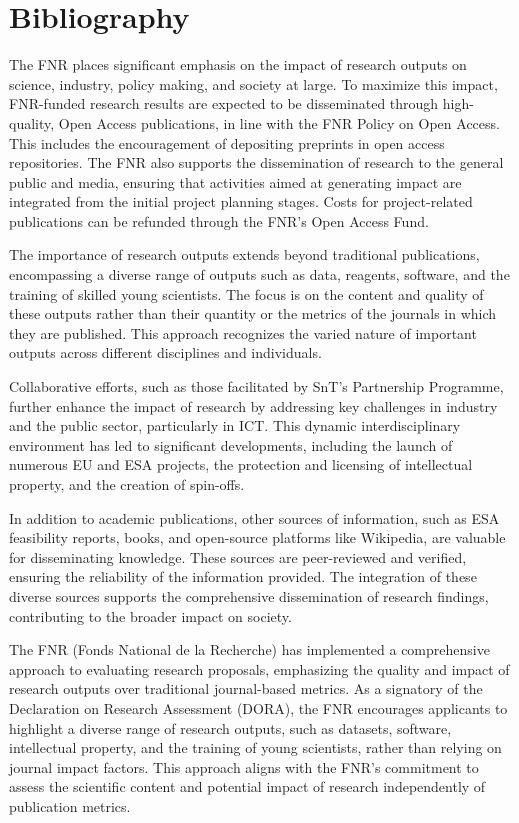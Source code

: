 \documentclass{article}
\begin{document}
\section{Bibliography}

The FNR places significant emphasis on the impact of research outputs on science, industry, policy making, and society at large. To maximize this impact, FNR-funded research results are expected to be disseminated through high-quality, Open Access publications, in line with the FNR Policy on Open Access. This includes the encouragement of depositing preprints in open access repositories. The FNR also supports the dissemination of research to the general public and media, ensuring that activities aimed at generating impact are integrated from the initial project planning stages. Costs for project-related publications can be refunded through the FNR’s Open Access Fund.

The importance of research outputs extends beyond traditional publications, encompassing a diverse range of outputs such as data, reagents, software, and the training of skilled young scientists. The focus is on the content and quality of these outputs rather than their quantity or the metrics of the journals in which they are published. This approach recognizes the varied nature of important outputs across different disciplines and individuals.

Collaborative efforts, such as those facilitated by SnT’s Partnership Programme, further enhance the impact of research by addressing key challenges in industry and the public sector, particularly in ICT. This dynamic interdisciplinary environment has led to significant developments, including the launch of numerous EU and ESA projects, the protection and licensing of intellectual property, and the creation of spin-offs.

In addition to academic publications, other sources of information, such as ESA feasibility reports, books, and open-source platforms like Wikipedia, are valuable for disseminating knowledge. These sources are peer-reviewed and verified, ensuring the reliability of the information provided. The integration of these diverse sources supports the comprehensive dissemination of research findings, contributing to the broader impact on society.

The FNR (Fonds National de la Recherche) has implemented a comprehensive approach to evaluating research proposals, emphasizing the quality and impact of research outputs over traditional journal-based metrics. As a signatory of the Declaration on Research Assessment (DORA), the FNR encourages applicants to highlight a diverse range of research outputs, such as datasets, software, intellectual property, and the training of young scientists, rather than relying on journal impact factors. This approach aligns with the FNR's commitment to assess the scientific content and potential impact of research independently of publication metrics.
\end{document}
